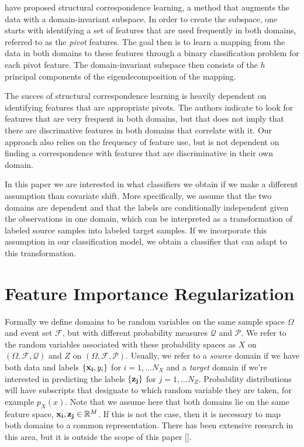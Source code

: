 \documentclass[twoside,11pt]{article}
\begin{document}
\cite{blitzer2006domain} have proposed structural correspondence learning, a method that augments the data with a domain-invariant subspace. In order to create the subspace, one starts with identifying a set of features that are used frequently in both domains, referred to as the \emph{pivot} features. The goal then is to learn a mapping from the data in both domains to these features through a binary classification problem for each pivot feature. The domain-invariant subspace then consists of the $h$ principal components of the eigendecomposition of the mapping.

The succes of structural correspondence learning is heavily dependent on identifying features that are appropriate pivots. The authors indicate to look for features that are very frequent in both domains, but that does not imply that there are discrimative features in both domains that correlate with it. Our approach also relies on the frequency of feature use, but is not dependent on finding a correspondence with features that are discriminative in their own domain.

In this paper we are interested in what classifiers we obtain if we make a different assumption than covariate shift. More specifically, we assume that the two domains are dependent and that the labels are conditionally independent given the observations in one domain, which can be interpreted as a transformation of labeled source samples into labeled target samples. If we incorporate this assumption in our classification model, we obtain a classifier that can adapt to this transformation.

\section{Feature Importance Regularization}
Formally we define domains to be random variables on the same sample space $\Omega$ and event set $\mathcal{F}$, but with different probability measures $\mathcal{Q}$ and $\mathcal{P}$. We refer to the random variables associated with these probability spaces as $X$ on $(\Omega, \mathcal{F}, \mathcal{Q})$ and ${Z}$ on $(\Omega, \mathcal{F}, \mathcal{P})$. Usually, we refer to a \emph{source} domain if we have both data and labels $\{{\bf x_{i}}, y_{i}\}$ for  $i = 1,...N_{X}$ and a \emph{target} domain if we're interested in predicting the labels $\{{\bf z_{j}}\}$ for $j = 1,...N_{Z}$. Probability distributions will have subscripts that designate to which random variable they are taken, for example $p_{X}(x)$. Note that we assume here that both domains lie on the same feature space, ${\bf x_{i}, z_{j}} \in \mathbb{R}^{M}$. If this is not the case, then it is necessary to map both domains to a common representation. There has been extensive research in this area, but it is outside the scope of this paper [\cite{ben2007analysis, shao2014generalized}]. 
\end{document}
